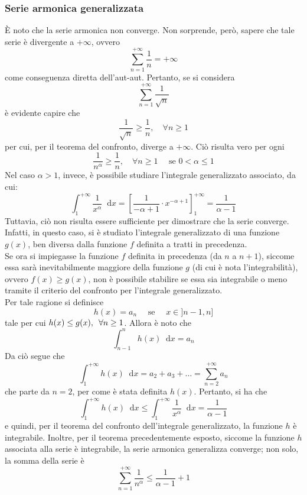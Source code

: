 \documentclass[a4paper]{extarticle}
\newcommand*\dif{\mathop{}\!\mathrm{d}}
\begin{document}
\vspace{1em}
\noindent
\subsubsection{Serie armonica generalizzata}
È noto che la serie armonica non converge. Non sorprende, però, sapere che tale serie è divergente a $+\infty$, ovvero
\[\sum_{n=1}^{+\infty} \frac{1}{n} = + \infty\]
come conseguenza diretta dell'aut-aut. Pertanto, se si considera
\[\sum_{n=1}^{+\infty} \frac{1}{\sqrt{n}}\]
è evidente capire che
\[\frac{1}{\sqrt{n}} \geq \frac{1}{n}, \hspace{1em} \forall n \geq 1\]
per cui, per il teorema del confronto, diverge a $+\infty$. Ciò risulta vero per ogni
\[\frac{1}{n^\alpha} \geq \frac{1}{n},\hspace{1em} \forall n \geq 1 \hspace{1em} \text{ se } 0 < \alpha \leq 1\]
Nel caso $\alpha > 1$, invece, è possibile studiare l'integrale generalizzato associato, da cui:
\[\int_1^{+\infty} \frac{1}{x^\alpha} \dif x = \left[\frac{1}{-\alpha+1} \cdot x^{-\alpha+1}\right]_1^{+\infty} = \frac{1}{\alpha-1}\]
Tuttavia, ciò non risulta essere sufficiente per dimostrare che la serie converge. Infatti, in questo caso, si è studiato l'integrale generalizzato di una funzione $g(x)$, ben diversa dalla funzione $f$ definita a tratti in precedenza.\\
Se ora si impiegasse la funzione $f$ definita in precedenza (da $n$ a $n+1$), siccome essa sarà inevitabilmente maggiore della funzione $g$ (di cui è nota l'integrabilità), ovvero $f(x) \geq g(x)$, non è possibile stabilire se essa sia integrabile o meno tramite il criterio del confronto per l'integrale generalizzato.\\
Per tale ragione si definisce
\[h(x)=a_n \hspace{1em} \text{ se } \hspace{1em} x \in ]n-1,n]\]
tale per cui $h(x) \leq g(x), \hspace{0.5em} \forall n \geq 1$. Allora è noto che
\[\int_{n-1}^n h(x) \dif x = a_n\]
Da ciò segue che
\[\int_1^{+\infty} h(x) \dif x=a_2+a_3+\dots=\sum_{n=2}^{+\infty} a_n\]
che parte da $n=2$, per come è stata definita $h(x)$. Pertanto, si ha che
\[\int_1^{+\infty} h(x) \dif x \leq \int_1^{+\infty} \frac{1}{x^\alpha} \dif x = \frac{1}{\alpha-1}\]
e quindi, per il teorema del confronto dell'integrale generalizzato, la funzione $h$ è integrabile. Inoltre, per il teorema precedentemente esposto, siccome la funzione $h$ associata alla serie è integrabile, la serie armonica generalizza converge; non solo, la somma della serie è
\[\sum_{n=1}^{+\infty} \frac{1}{n^\alpha} \leq \frac{1}{\alpha-1}+1\]
\end{document}
